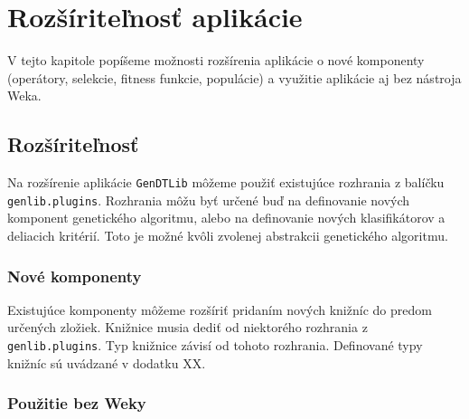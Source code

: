\chapter{Rozšíriteľnosť aplikácie}
V tejto kapitole popíšeme možnosti rozšírenia aplikácie o nové komponenty (operátory, selekcie, fitness funkcie, populácie) a využitie aplikácie aj bez nástroja Weka.

\section{Rozšíriteľnosť}\label{kap4:4.4:Plugin}
Na rozšírenie aplikácie \verb|GenDTLib| môžeme použiť existujúce rozhrania z balíčku \verb|genlib.plugins|. Rozhrania môžu byť určené buď na definovanie nových komponent genetického algoritmu, alebo na definovanie nových klasifikátorov a deliacich kritérií. Toto je možné kvôli zvolenej abstrakcii genetického algoritmu.
\subsection{Nové komponenty}
Existujúce komponenty môžeme rozšíriť pridaním nových knižníc do predom určených zložiek. Knižnice musia dediť od niektorého rozhrania z \verb|genlib.plugins|. Typ knižnice závisí od tohoto rozhrania. Definované typy knižníc sú uvádzané v dodatku XX.

\subsection{Použitie bez Weky}